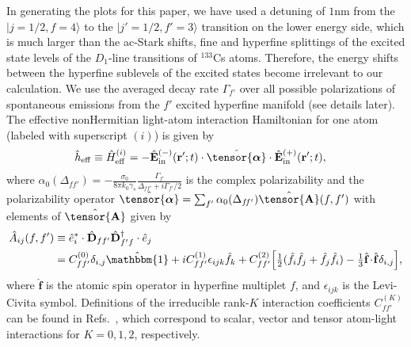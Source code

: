 \documentclass[preprint,aps,pra,onecolumn,superscriptaddress]{revtex4-1} %
\def\ket#1{\lvert{#1}\rangle}%
\newcommand{\smallfrac}[2]{\mbox{$\frac{#1}{#2}$}}
\newcommand{\poltens}{\hat{\tensor{\boldsymbol{\alpha}}}}
\newcommand{\charpol}{\alpha_0(\Delta_{f\!f'})}
\begin{document}
\begin{appendix}
In generating the plots for this paper, we have used a detuning of $1$nm from the $ \ket{j=1/2,f=4} $ to the $ \ket{j'=1/2,f'=3} $ transition on the lower energy side, which is much larger than the ac-Stark shifts, fine and hyperfine splittings of the excited state levels of the $ D_1 $-line transitions of $ ^{133} $Cs atoms. Therefore, the energy shifts between the hyperfine sublevels of the excited states become irrelevant to our calculation. 
We use the averaged decay rate $ \Gamma_{f'} $ over all possible polarizations of spontaneous emissions from the $ f' $ excited hyperfine manifold (see details later). 
The effective nonHermitian light-atom interaction Hamiltonian for one atom (labeled with superscript $ (i) $) is given by
\begin{align}
\hat{h}_{\rm eff}\equiv \hat{H}_{\rm eff}^{(i)} &= - \hat{\mathbf{E}}^{(-)}_{\rm in}(\mathbf{r}' ; t ) \cdot \poltens \cdot \hat{\mathbf{E}}^{(+)}_{\rm in}(\mathbf{r}' ;t ),
\end{align}
where $\charpol = -\frac{\sigma_0}{8\pi k_0\gamma_s}\frac{\Gamma_{f'}}{\Delta_{ff'}+i\Gamma_{f'}/2}$ is the complex polarizability and the polarizability operator $  \poltens=\sum_{f'}\charpol\hat{\tensor{\mathbf{A}}}(f,f')$ with elements of $ \hat{\tensor{\mathbf{A}}} $ given by
\begin{align} \label{Eq::PolarizabilityIrrep}
		\hat{A}_{ij}(f,f')&\equiv \hat{e}_i^*\cdot\hat{\mathbf{D}}_{ff'}\hat{\mathbf{D}}_{f'f}^\dagger \cdot \hat{e}_j \\
		&=  C_{ff'}^{(0)} \delta_{i,j}\hat{\mathbbm{1}}+ iC_{ff'}^{(1)}\epsilon_{ijk}\hat{f}_k+ C_{ff'}^{(2)} \Big[ \smallfrac{1}{2} ( \hat{f}_i\hat{f}_j +\hat{f}_j\hat{f}_i )-\smallfrac{1}{3} \hat{\mathbf{f}}\!\cdot\!\hat{\mathbf{f}} \delta_{i,j} \Big], 
\end{align}
where $\hat{\mathbf{f}}$ is the atomic spin operator in hyperfine multiplet $f$, and $ \epsilon_{ijk} $ is the Levi-Civita symbol. 
Definitions of the irreducible rank-$ K $ interaction coefficients $ C_{ff'}^{(K)} $ can be found in Refs.~\cite{Qi2016,Deutsch2010a}, which correspond to scalar, vector and tensor atom-light interactions for $ K=0,1,2 $, respectively.


\end{appendix}
\end{document}
